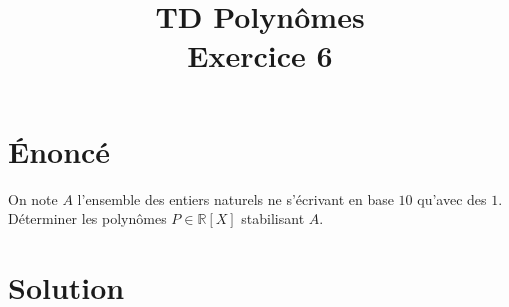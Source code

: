 \documentclass[french]{article}
\title{TD Polynômes \\ Exercice 6}
\date{}
\newcommand{\R}{\mathbb{R}}
\begin{document}
\maketitle

\section{Énoncé}
On note $A$ l'ensemble des entiers naturels ne s'écrivant en base $10$ qu'avec des $1$. Déterminer les polynômes $P\in\R[X]$ stabilisant $A$.
\section{Solution}
\end{document}

